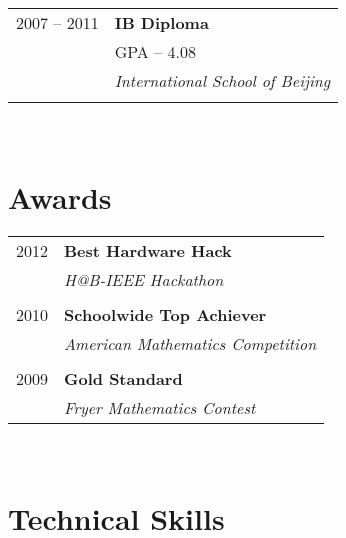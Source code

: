 \documentclass[10pt]{article} %
\begin{document}
{\begin{minipage}[t]{0.44\textwidth}
\begin{tabular}{ll}

2007 -- 2011 & \textbf{IB Diploma} \\ 
& \small GPA -- 4.08 \\
& \textit{International School of Beijing}\\
&\\
	 

\end{tabular}\\


\section{Awards} 

\begin{tabular}{rl}
2012	 & \textbf{Best Hardware Hack}\\
& \textit{H@B-IEEE Hackathon}\\ \\


2010	 & \textbf{Schoolwide Top Achiever}\\
& \textit{American Mathematics Competition}\\ \\


2009	 & \textbf{Gold Standard}\\
& \textit{Fryer Mathematics Contest}
\end{tabular}\\[10pt]


\section{Technical Skills} 
\\[10pt] \\[10pt]


\end{minipage}}
\end{document}
